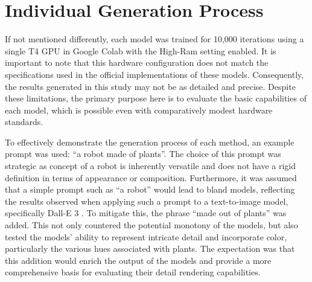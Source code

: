 \section{Individual Generation Process}\label{generationProcess}

If not mentioned differently, each model was trained for 10,000 iterations using a single T4 GPU in Google Colab with the High-Ram setting enabled. It is important to note that this hardware configuration does not match the specifications used in the official implementations of these models. Consequently, the results generated in this study may not be as detailed and precise. Despite these limitations, the primary purpose here is to evaluate the basic capabilities of each model, which is possible even with comparatively modest hardware standards.

To effectively demonstrate the generation process of each method, an example prompt was used: ``a robot made of plants''. The choice of this prompt was strategic as concept of a robot is inherently versatile and does not have a rigid definition in terms of appearance or composition. Furthermore, it was assumed that a simple prompt such as ``a robot'' would lead to bland models, reflecting the results observed when applying such a prompt to a text-to-image model, specifically Dall-E 3 \citep{dalle3}. To mitigate this, the phrase ``made out of plants'' was added. This not only countered the potential monotony of the models, but also tested the models' ability to represent intricate detail and incorporate color, particularly the various hues associated with plants. The expectation was that this addition would enrich the output of the models and provide a more comprehensive basis for evaluating their detail rendering capabilities.






